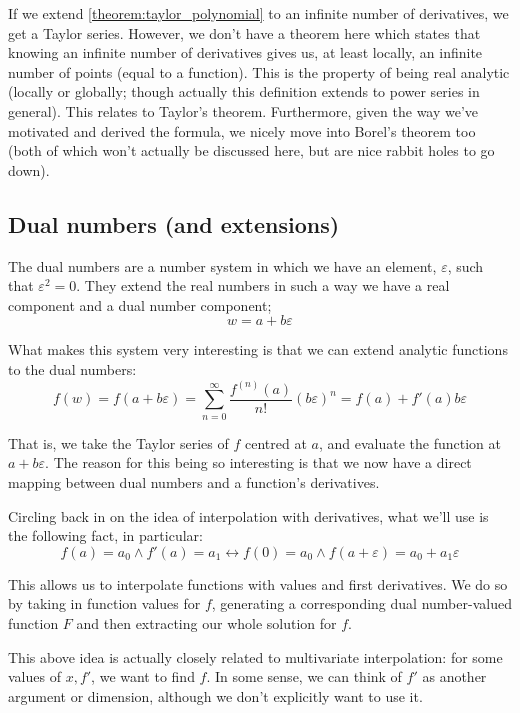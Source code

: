 If we extend \ref{theorem:taylor_polynomial} to an infinite number of derivatives, we get a Taylor series. However, we don't have a theorem here which states that knowing an infinite number of derivatives gives us, at least locally, an infinite number of points (equal to a function). This is the property of being real analytic (locally or globally; though actually this definition extends to power series in general). This relates to Taylor's theorem. Furthermore, given the way we've motivated and derived the formula, we nicely move into Borel's theorem too (both of which won't actually be discussed here, but are nice rabbit holes to go down).


\subsection{Dual numbers (and extensions)}
\label{section:dual_numbers}
The dual numbers are a number system in which we have an element, $\varepsilon$, such that $\varepsilon^2=0$. They extend the real numbers in such a way we have a real component and a dual number component;
$$
w=a+b\varepsilon
$$

What makes this system very interesting is that we can extend analytic functions to the dual numbers:
$$
f(w)=f(a+b\varepsilon)=\sum_{n=0}^{\infty}{\frac{f^{(n)}(a)}{n!}(b\varepsilon)^n}=f(a)+f'(a)b\varepsilon
$$

That is, we take the Taylor series of $f$ centred at $a$, and evaluate the function at $a+b\varepsilon$. The reason for this being so interesting is that we now have a direct mapping between dual numbers and a function's derivatives.

Circling back in on the idea of interpolation with derivatives, what we'll use is the following fact, in particular:
$$
    f(a)=a_0\land f'(a)=a_1\leftrightarrow f(0)=a_0\land f(a+\varepsilon)=a_0+a_1\varepsilon
$$

This allows us to interpolate functions with values and first derivatives. We do so by taking in function values for $f$, generating a corresponding dual number-valued function $F$ and then extracting our whole solution for $f$.

This above idea is actually closely related to multivariate interpolation: for some values of $x, f'$, we want to find $f$. In some sense, we can think of $f'$ as another argument or dimension, although we don't explicitly want to use it.

